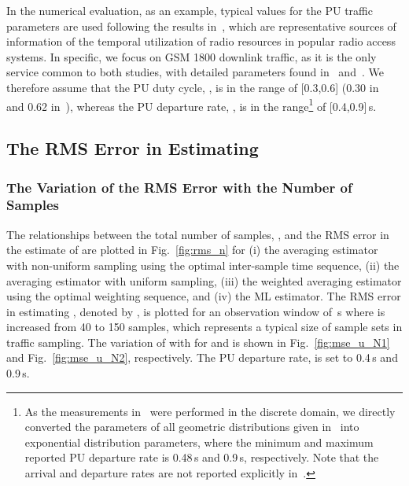 \documentclass[11pt,draftclsnofoot,journal,onecolumn]{IEEEtran}
\begin{document}
In the numerical evaluation, as an example, typical values for the PU traffic parameters are used following the results in~\cite{liang_tmc_2011,wellens_phycom_2009}, which are representative sources of information of the temporal utilization of radio resources in popular radio access systems. In specific, we focus on GSM 1800 downlink traffic, as it is the only service common to both studies, with detailed parameters found in~\cite[Tab. VIII]{liang_tmc_2011} and~\cite[Tab. 3]{wellens_phycom_2009}. We therefore assume that the PU duty cycle, , is in the range of [0.3,0.6] (0.30 in~\cite{liang_tmc_2011} and 0.62 in~\cite{wellens_phycom_2009}), whereas the PU departure rate, , is in the range\footnote{As the measurements in~\cite{wellens_phycom_2009} were performed in the discrete domain, we directly converted the parameters of all geometric distributions given in~\cite[Tab. 3]{wellens_phycom_2009} into exponential distribution parameters, where the minimum and maximum reported PU departure rate is 0.48\,s and 0.9\,s, respectively. Note that the arrival and departure rates are not reported explicitly in~\cite{liang_tmc_2011}.} of [0.4,0.9]\,s.

\subsection{The RMS Error in Estimating }
\label{sec:num_MSE_u}

\subsubsection{The Variation of the RMS Error with the Number of Samples}

The relationships between the total number of samples, , and the RMS error in the estimate of  are plotted in Fig.~\ref{fig:rms_n} for (i) the averaging estimator with non-uniform sampling using the optimal inter-sample time sequence, (ii) the averaging estimator with uniform sampling, (iii) the weighted averaging estimator using the optimal weighting sequence, and (iv) the ML estimator. The RMS error in estimating , denoted by , is plotted for an observation window of \,s where  is increased from 40 to 150 samples, which represents a typical size of sample sets in traffic sampling. The variation of  with  for  and  is shown in Fig.~\ref{fig:mse_u_N1} and Fig.~\ref{fig:mse_u_N2}, respectively. The PU departure rate,  is set to 0.4\,s and 0.9\,s.
\end{document}
